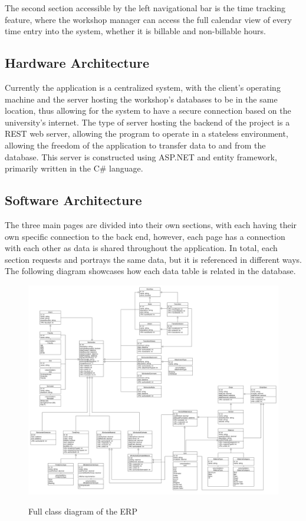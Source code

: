 {{{{{{{The second section accessible by the left navigational bar is the time tracking feature, where the workshop manager can access the full calendar view of every time entry into the system, whether it is billable and non-billable hours. 

\subsection{Hardware Architecture}
Currently the application is a centralized system, with the client's operating machine and the server hosting the workshop's databases to be in the same location, thus allowing for the system to have a secure connection based on the university's internet. The type of server hosting the backend of the project is a REST web server, allowing the program to operate in a stateless environment, allowing the freedom of the application to transfer data to and from the database. This server is constructed using ASP.NET and entity framework, primarily written in the C\# language.   

\subsection{Software Architecture}
The three main pages are divided into their own sections, with each having their own specific connection to the back end, however, each page has a connection with each other as data is shared throughout the application. In total, each section requests and portrays the same data, but it is referenced in different ways. The following diagram showcases how each data table is related in the database.  
\begin{figure}[H]
	\centering
	\includegraphics[width=7in]{class.png}\\
	\caption{Full class diagram of the ERP}
	\label{fig:tobias}
\end{figure}

}}}}}}}
